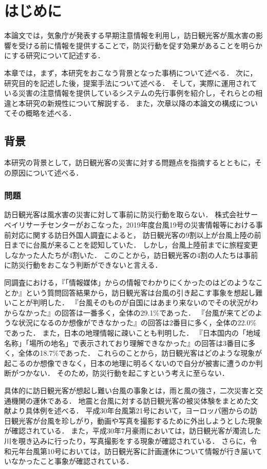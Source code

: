 \documentclass[a4paper,11pt,oneside,openany]{jsbook}
\begin{document}
\chapter{はじめに}
本論文では，気象庁が発表する早期注意情報を利用し，訪日観光客が風水害の影響を受ける前に情報を提供することで，防災行動を促す効果があることを明らかにする研究について記述する．

本章では，まず，本研究をおこなう背景となった事柄について述べる．
次に，研究目的を記述した後，提案手法について述べる．
そして，実際に運用されている災害の注意情報を提供しているシステムの先行事例を紹介し，それらとの相違と本研究の新規性について解説する．
また，次章以降の本論文の構成についてその概略を述べる．

\section{背景}
本研究の背景として，訪日観光客の災害に対する問題点を指摘するとともに，その原因について述べる．

\subsection{問題}
訪日観光客は風水害の災害に対して事前に防災行動を取らない．
株式会社サーベイリサーチセンターがおこなった，2019年度台風19号の災害情報等における事前対応に関する訪日外国人調査\cite{Typhoon}によると，
訪日観光客の9割以上が台風上陸の前日までに台風が来ることを認知していた．
しかし，台風上陸前までに旅程変更しなかった人たちが4割いた．
このことから，訪日観光客の4割の人たちは事前に防災行動をおこなう判断ができないと言える．

同調査における，『「情報媒体」からの情報でわかりにくかったのはどのようなことか』という質問回答結果から，訪日観光客は台風の引き起こす事象を想起し難いことが判明した．
『台風そのものが自国にはあまり来ないのでその状況がわからなかった』の回答は一番多く，全体の29.1\%であった．
『台風が来てどのような状況になるのか想像ができなかった』の回答は2番目に多く，全体の22.0\%であった．
また，日本の地理情報に疎いことも判明した．
『日本国内の「地域名称」「場所の地名」で表示されており理解できなかった』の回答は3番目に多く，全体の18.7\%であった．
これらのことから，訪日観光客はどのような現象が起こるのか想像できなく，日本の地理に明るくないので自分が被害に遭うのか判断がつかない．
そのため，防災行動を起こすという考えに至らない．

具体的に訪日観光客が想起し難い台風の事象とは，雨と風の強さ，二次災害と交通機関の運休である．
地震と台風に対する訪日観光客の被災体験をまとめた文献\cite{1050565163716925056}より具体例を述べる．
平成30年台風第21号において，ヨーロッパ圏からの訪日観光客が台風を珍しがり，動画や写真を撮影するために外出しようとした現象\cite{hounitilabo}が確認されている．
また，平成30年7月豪雨においては，訪日観光客が濁流した川を覗き込みに行ったり，写真撮影をする現象\cite{nihonhousou}が確認されている．
さらに，令和元年台風第10号においては，訪日観光客に計画運休について情報が行き届いていなかったこと事象\cite{nihonkeizaisinbun}が確認されている．
\end{document}
